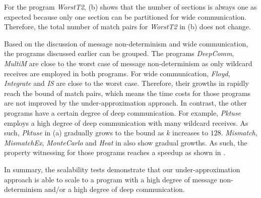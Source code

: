 For the program \textit{WorstT2},  (b) shows that the number of sections is always one as expected because only one section can be partitioned for wide communication. 
Therefore, the total number of match pairs for \textit{WorstT2} in  (b) does not change. 

Based on the discussion of message non-determinism and wide communication, the programs discussed earlier can be grouped. The programs \textit{DeepComm}, \textit{MultiM} are close to the worst case of message non-determinism as only wildcard receives are employed in both programs. For wide communication, \textit{Floyd}, \textit{Integrate} and \textit{IS} are close to the worst case. Therefore, their growths in  rapidly reach the bound of match pairs, which means the time costs for those programs are not improved by the under-approximation approach. 
In contrast, the other programs have a certain degree of deep communication. For example, \textit{Pktuse} employs a high degree of deep communication with many wildcard receives. As such, \textit{Pktuse} in  (a) gradually grows to the bound as $k$ increases to $128$.
\textit{Mismatch}, \textit{MismatchEx}, \textit{MonteCarlo} and \textit{Heat} in  also show gradual growths. 
As such, the property witnessing for those programs reaches a speedup as shown in .

In summary, the scalability tests demonstrate that our under-approximation approach is able to scale to a program with a high degree of message non-determinism and/or a high degree of deep communication.

